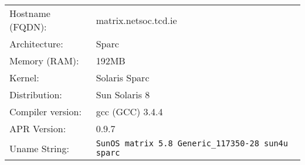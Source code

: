 \begin{tabular}{ll}
Hostname (FQDN):	&	matrix.netsoc.tcd.ie				\\
Architecture:		&	Sparc									\\
Memory (RAM):		&	192MB									\\
Kernel:				&	Solaris Sparc						\\
Distribution:		&	Sun Solaris 8						\\
Compiler version:	&	gcc (GCC) 3.4.4					\\
APR Version:		&	0.9.7									\\
Uname String:		& \verb!SunOS matrix 5.8 Generic_117350-28 sun4u sparc! \\
\end{tabular}


